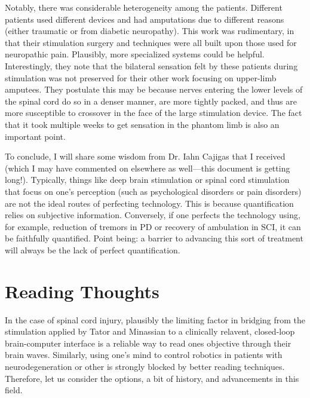 Notably, there was considerable heterogeneity among the patients. Different patients used different devices and had amputations due to different reasons (either traumatic or from diabetic neuropathy). This work was rudimentary, in that their stimulation surgery and techniques were all built upon those used for neuropathic pain. Plausibly, more specialized systems could be helpful. Interestingly, they note that the bilateral sensation felt by these patients during stimulation was not preserved for their other work focusing on upper-limb amputees. They postulate this may be because nerves entering the lower levels of the spinal cord do so in a denser manner, are more tightly packed, and thus are more susceptible to crossover in the face of the large stimulation device. The fact that it took multiple weeks to get sensation in the phantom limb is also an important point.\newline

To conclude, I will share some wisdom from Dr. Iahn Cajigas that I received (which I may have commented on elsewhere as well---this document is getting long!). Typically, things like deep brain stimulation or spinal cord stimulation that focus on one's perception (such as psychological disorders or pain disorders) are not the ideal routes of perfecting technology. This is because quantification relies on subjective information. Conversely, if one perfects the technology using, for example, reduction of tremors in PD or recovery of ambulation in SCI, it can be faithfully quantified. Point being: a barrier to advancing this sort of treatment will always be the lack of perfect quantification. 






\chapter{Reading Thoughts} 

In the case of spinal cord injury, plausibly the limiting factor in bridging from the stimulation applied by Tator and Minassian to a clinically relavent, closed-loop brain-computer interface is a reliable way to read ones objective through their brain waves. Similarly, using one's mind to control robotics in patients with neurodegeneration or other is strongly blocked by better reading techniques. Therefore, let us consider the options, a bit of history, and advancements in this field.

